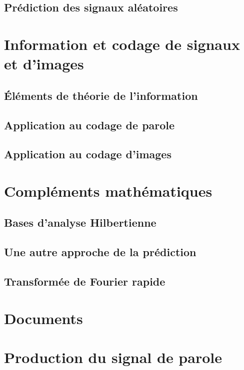 \documentclass[[a4paper,10pt]{book}              %
\begin{document}
\chapter{Pr\'ediction des signaux al\'eatoires}
\label{chap:Prediction}

\part{Information et codage de signaux et d'images}
\chapter{\'El\'ements de th\'eorie de l'information}
\label{info-chap}

\chapter{Application au codage de parole}


\chapter{Application au codage d'images}


\appendix
\part{Compl\'ements math\'ematiques}
\chapter{Bases d'analyse Hilbertienne}

\chapter{Une autre approche de la prédiction}

\chapter{Transformée de Fourier rapide}

\part{Documents}
\part{Production du signal de parole}

\end{document}
